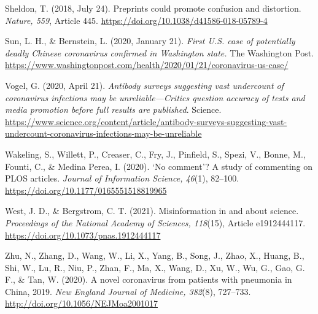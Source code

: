 \documentclass[authordate, empirical]{jote-new-article}
\begin{document}
	Sheldon, T. (2018, July 24). Preprints could promote confusion and distortion. \emph{Nature, 559}, Article 445. \url{https://doi.org/10.1038/d41586-018-05789-4}







	Sun, L. H., \& Bernstein, L. (2020, January 21). \emph{First U.S. case of potentially deadly Chinese coronavirus confirmed in Washington state. }The Washington Post. \url{https://www.washingtonpost.com/health/2020/01/21/coronavirus-us-case/}







	Vogel, G. (2020, April 21). \emph{Antibody surveys suggesting vast undercount of coronavirus infections may be unreliable—Critics question accuracy of tests and media promotion before full results are published}. Science. \url{https://www.science.org/content/article/antibody-surveys-suggesting-vast-undercount-coronavirus-infections-may-be-unreliable}







	Wakeling, S., Willett, P., Creaser, C., Fry, J., Pinfield, S., Spezi, V., Bonne, M., Founti, C., \& Medina Perea, I. (2020). ‘No comment'? A study of commenting on PLOS articles. \emph{Journal of Information Science, 46}(1), 82--100. \url{https://doi.org/10.1177/0165551518819965}







	West, J. D., \& Bergstrom, C. T. (2021). Misinformation in and about science. \emph{Proceedings of the National Academy of Sciences, 118}(15), Article e1912444117. \href{https://doi.org/10.1073/pnas.1912444117}{https://doi.org/10.1073/pnas.1912444117}







	Zhu, N., Zhang, D., Wang, W., Li, X., Yang, B., Song, J., Zhao, X., Huang, B., Shi, W., Lu, R., Niu, P., Zhan, F., Ma, X., Wang, D., Xu, W., Wu, G., Gao, G. F., \& Tan, W. (2020). A novel coronavirus from patients with pneumonia in China, 2019. \emph{New England Journal of Medicine, 382}(8), 727--733. \url{http://doi.org/10.1056/NEJMoa2001017}
\end{document}
